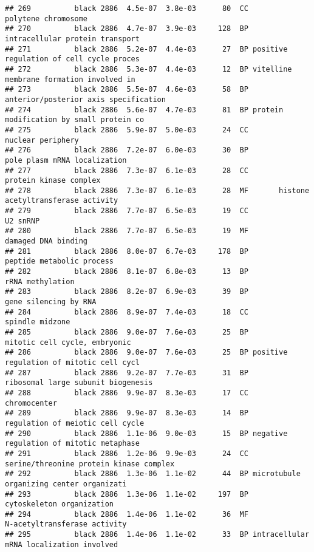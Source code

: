 \documentclass[]{article}
\begin{document}
\begin{verbatim}
## 269          black 2886  4.5e-07  3.8e-03      80  CC                      polytene chromosome
## 270          black 2886  4.7e-07  3.9e-03     128  BP          intracellular protein transport
## 271          black 2886  5.2e-07  4.4e-03      27  BP positive regulation of cell cycle proces
## 272          black 2886  5.3e-07  4.4e-03      12  BP vitelline membrane formation involved in
## 273          black 2886  5.5e-07  4.6e-03      58  BP    anterior/posterior axis specification
## 274          black 2886  5.6e-07  4.7e-03      81  BP protein modification by small protein co
## 275          black 2886  5.9e-07  5.0e-03      24  CC                        nuclear periphery
## 276          black 2886  7.2e-07  6.0e-03      30  BP             pole plasm mRNA localization
## 277          black 2886  7.3e-07  6.1e-03      28  CC                   protein kinase complex
## 278          black 2886  7.3e-07  6.1e-03      28  MF       histone acetyltransferase activity
## 279          black 2886  7.7e-07  6.5e-03      19  CC                                 U2 snRNP
## 280          black 2886  7.7e-07  6.5e-03      19  MF                      damaged DNA binding
## 281          black 2886  8.0e-07  6.7e-03     178  BP                peptide metabolic process
## 282          black 2886  8.1e-07  6.8e-03      13  BP                         rRNA methylation
## 283          black 2886  8.2e-07  6.9e-03      39  BP                    gene silencing by RNA
## 284          black 2886  8.9e-07  7.4e-03      18  CC                          spindle midzone
## 285          black 2886  9.0e-07  7.6e-03      25  BP            mitotic cell cycle, embryonic
## 286          black 2886  9.0e-07  7.6e-03      25  BP positive regulation of mitotic cell cycl
## 287          black 2886  9.2e-07  7.7e-03      31  BP       ribosomal large subunit biogenesis
## 288          black 2886  9.9e-07  8.3e-03      17  CC                             chromocenter
## 289          black 2886  9.9e-07  8.3e-03      14  BP         regulation of meiotic cell cycle
## 290          black 2886  1.1e-06  9.0e-03      15  BP negative regulation of mitotic metaphase
## 291          black 2886  1.2e-06  9.9e-03      24  CC  serine/threonine protein kinase complex
## 292          black 2886  1.3e-06  1.1e-02      44  BP microtubule organizing center organizati
## 293          black 2886  1.3e-06  1.1e-02     197  BP                cytoskeleton organization
## 294          black 2886  1.4e-06  1.1e-02      36  MF             N-acetyltransferase activity
## 295          black 2886  1.4e-06  1.1e-02      33  BP intracellular mRNA localization involved

\end{verbatim}
\end{document}

